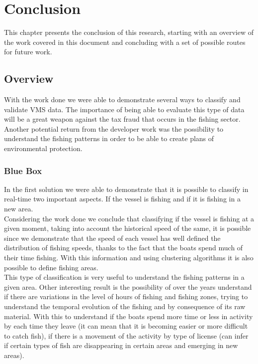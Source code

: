 % 
%  
%
\chapter{Conclusion}
\label{cha:conclusion}

This chapter presents the conclusion of this research, starting with an overview of the work covered in this document and concluding with a set of possible routes for future work.

\section{Overview} %
\label{sec:overview}
With the work done we were able to demonstrate several ways to classify and validate VMS data. The importance of being able to evaluate this type of data will be a great weapon against the tax fraud that occurs in the fishing sector. Another potential return from the developer work was the possibility to understand the fishing patterns in order to be able to create plans of environmental protection.

\subsection{Blue Box} %
\label{sec:blue_box}

In the first solution we were able to demonstrate that it is possible to classify in real-time two important aspects. If the vessel is fishing and if it is fishing in a new area.\\
Considering the work done we conclude that classifying if the vessel is fishing at a given moment, taking into account the historical speed of the same, it is possible since we demonstrate that the speed of each vessel has well defined the distribution of fishing speeds, thanks to the fact that the boats spend much of their time fishing.
With this information and using clustering algorithms it is also possible to define fishing areas.\\

This type of classification is very useful to understand the fishing patterns in a given area. Other interesting result is the possibility of over the years  understand if there are variations in the level of hours of fishing and fishing zones, trying to understand the temporal evolution of the fishing and by consequence of its raw material. With this to understand if the boats spend more time or less in activity by each time they leave (it can mean that it is becoming easier or more difficult to catch fish), if there is a movement of the activity by type of license (can infer if certain types of fish are disappearing in certain areas and emerging in new areas).


